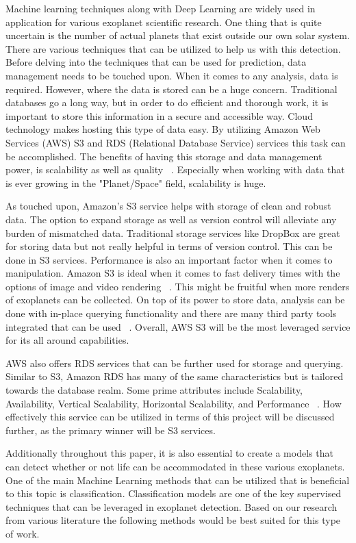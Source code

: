 \documentclass[letterpaper, 10 pt, conference]{ieeeconf}  %
\begin{document}
Machine learning techniques along with Deep Learning are widely used in application for various exoplanet scientific research. One thing that is quite uncertain is the number of actual planets that exist outside our own solar system. There are various techniques that can be utilized to help us with this detection. Before delving into the techniques that can be used for prediction, data management needs to be touched upon. When it comes to any analysis, data is required. However, where the data is stored can be a huge concern. Traditional databases go a long way, but in order to do efficient and thorough work, it is important to store this information in a secure and accessible way. Cloud technology makes hosting this type of data easy. By utilizing Amazon Web Services (AWS) S3 and RDS (Relational Database Service) services this task can be accomplished. The benefits of having this storage and data management power, is scalability as well as quality ~\cite{CloudDataManagement}. Especially when working with data that is ever growing in the "Planet/Space" field, scalability is huge. 

As touched upon, Amazon's S3 service helps with storage of clean and robust data. The option to expand storage as well as version control will alleviate any burden of mismatched data. Traditional storage services like DropBox are great for storing data but not really helpful in terms of version control. This can be done in S3 services. Performance is also an important factor when it comes to manipulation. Amazon S3 is ideal when it comes to fast delivery times with the options of image and video rendering ~\cite{AmazonS3}. This might be fruitful when more renders of exoplanets can be collected. On top of its power to store data, analysis can be done with in-place querying functionality and there are many third party tools integrated that can be used ~\cite{AmazonS3}. Overall, AWS S3 will be the most leveraged service for its all around capabilities.

AWS also offers RDS services that can be further used for storage and querying. Similar to S3, Amazon RDS has many of the same characteristics but is tailored towards the database realm. Some prime attributes include Scalability, Availability, Vertical Scalability, Horizontal Scalability, and Performance ~\cite{AWSRDSBenefits}. How effectively this service can be utilized in terms of this project will be discussed further, as the primary winner will be S3 services. 

Additionally throughout this paper, it is also essential to create a models that can detect whether or not life can be accommodated in these various exoplanets. One of the main Machine Learning methods that can be utilized that is beneficial to this topic is classification. Classification models are one of the key supervised techniques that can be leveraged in exoplanet detection. Based on our research from various literature the following methods would be best suited for this type of work. 
\end{document}
